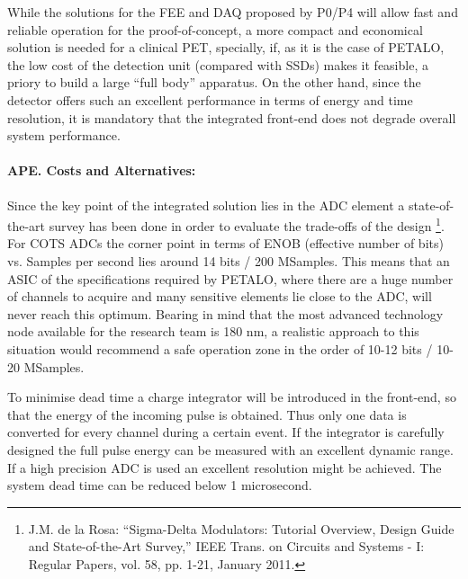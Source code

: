 While the solutions for the FEE and DAQ proposed by P0/P4 will allow fast and reliable operation for the proof-of-concept, a more compact and economical solution is needed for a clinical PET, specially, if, as it is the case of PETALO, the low cost of the detection unit (compared with SSDs) makes it feasible, a priory to build a large ``full body'' apparatus. On the other hand, since the detector offers such an excellent performance in terms of energy and time resolution, it is mandatory that the integrated front-end does not degrade overall system performance.

\paragraph{APE. Costs and Alternatives:}

Since the key point of the integrated solution lies in the ADC element a state-of-the-art survey has been done in order to evaluate the trade-offs of the design \footnote{J.M. de la Rosa: “Sigma-Delta Modulators: Tutorial Overview, Design Guide and State-of-the-Art Survey,” IEEE Trans. on Circuits and Systems - I: Regular Papers, vol. 58, pp. 1-21, January 2011.}. For COTS ADCs the corner point in terms of ENOB (effective number of bits) vs. Samples per second lies around 14 bits / 200 MSamples. This means that an ASIC of the specifications required by PETALO, where there are a huge number of channels to acquire and many sensitive elements lie close to the ADC, will never reach this optimum. Bearing in mind that the most advanced technology node available for the research team is 180 nm, a realistic approach to this situation would recommend a safe operation zone in the order of 10-12 bits / 10-20 MSamples.
 
To minimise dead time a charge integrator will be introduced in the front-end, so that the energy of the incoming pulse is obtained. Thus only one data is converted for every channel during a certain event. If the integrator is carefully designed the full pulse energy can be measured with an excellent dynamic range. If a high precision ADC is used an excellent resolution might be achieved. The system dead time can be reduced below 1 microsecond.

